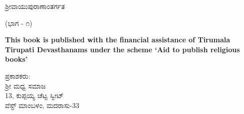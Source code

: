 \thispagestyle{empty}

\begin{center}
 ಶ‍್ರೀವಾಯುಪುರಾಣಾಂತರ್ಗತ 
\end{center}


\begin{center}
(ಭಾಗ - ೧)
\end{center}

\begin{center}
\textbf{This book is published with the financial assistance of Tirumala Tirupati Devasthanams under the scheme `Aid to publish religious books'}
\end{center}


\begin{center}
ಪ್ರಕಾಶಕರು: \\ ಶ‍್ರೀ ಮಧ್ವ ಸಮಾಜ \\ 13, ಕುಪ್ಪಯ್ಯ ಚೆಟ್ಟ ಸ್ವೀಟ್ \\ ವೆಸ್ಟ್ ಮಾಂಬಳಂ, ಮದರಾಸು-33
\end{center}

